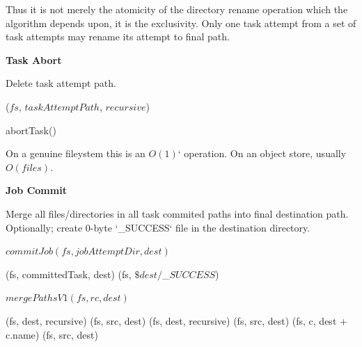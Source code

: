 \documentclass[conference]{IEEEtran}
\begin{document}
Thus it is not merely the atomicity of the directory rename operation
which the algorithm depends upon, it is the exclusivity.
Only one task attempt from a set of task attempts may rename its attempt to
final path.

\textbf{Task Abort}

Delete task attempt path.

\begin{procedure}[H]
  \delete($fs$, $taskAttemptPath$, $recursive$)\;
  \caption{abortTask()}
\end{procedure}


On a genuine fileystem this is an $O(1)$` operation.
On an object store, usually $O(files)$.


\textbf{Job Commit}

Merge all files/directories in all task commited paths into final destination path.
Optionally;
create 0-byte `\_SUCCESS` file in the destination directory.

\begin{procedure*}[H]
  \caption{$commitJob(fs, jobAttemptDir, dest)$}
   {
    \mergePaths(fs, committedTask, dest)\;
  }
  \touch(fs, $\$dest/$\_$SUCCESS$)\;
\end{procedure*}

\begin{procedure*}[H]
\label{alg:mergePathsV1}
\caption{$mergePathsV1(fs, rc, dest)$}

 {
   {
    \delete(fs, dest, recursive)\;
  }
  \rename(fs, src, dest)\;
} {
   {
     {
      \delete(fs, dest, recursive)\;
      \rename(fs, src, dest)\;
    } {
       {
       \mergePaths(fs, c, dest + c.name)\;
      }
    }
  }{
   \rename(fs, src, dest)\;
  }
}

\end{procedure*}
\end{document}
